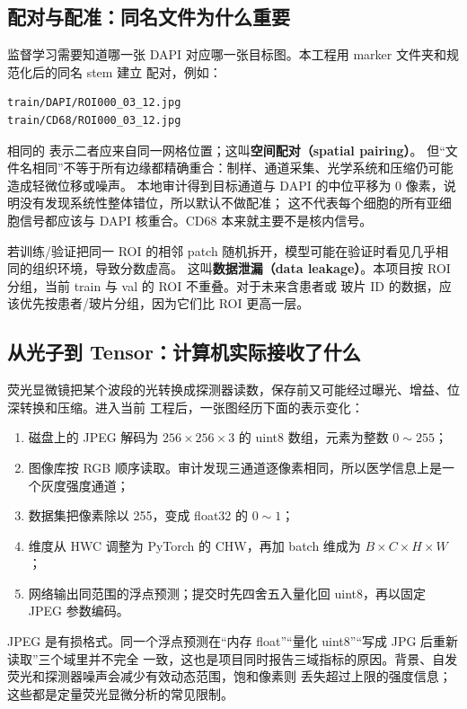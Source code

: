 \documentclass[12pt,a4paper,UTF8]{ctexart}
\newcommand{\code}[1]{\texttt{\detokenize{#1}}}
\newcommand{\term}[2]{\textbf{#1（#2）}}
\begin{document}
\subsection{配对与配准：同名文件为什么重要}

监督学习需要知道哪一张 DAPI 对应哪一张目标图。本工程用 marker 文件夹和规范化后的同名 stem 建立
配对，例如：

\begin{lstlisting}[style=shell]
train/DAPI/ROI000_03_12.jpg
train/CD68/ROI000_03_12.jpg
\end{lstlisting}

相同的 \code{ROI000_03_12}表示二者应来自同一网格位置；这叫\term{空间配对}{spatial pairing}。
但“文件名相同”不等于所有边缘都精确重合：制样、通道采集、光学系统和压缩仍可能造成轻微位移或噪声。
本地审计得到目标通道与 DAPI 的中位平移为 0 像素，说明没有发现系统性整体错位，所以默认不做配准；
这不代表每个细胞的所有亚细胞信号都应该与 DAPI 核重合。CD68 本来就主要不是核内信号。

若训练/验证把同一 ROI 的相邻 patch 随机拆开，模型可能在验证时看见几乎相同的组织环境，导致分数虚高。
这叫\term{数据泄漏}{data leakage}。本项目按 ROI 分组，当前 train 与 val 的 ROI 不重叠。对于未来含患者或
玻片 ID 的数据，应该优先按患者/玻片分组，因为它们比 ROI 更高一层。

\subsection{从光子到 Tensor：计算机实际接收了什么}

荧光显微镜把某个波段的光转换成探测器读数，保存前又可能经过曝光、增益、位深转换和压缩。进入当前
工程后，一张图经历下面的表示变化：

\begin{enumerate}
  \item 磁盘上的 JPEG 解码为 $256\times256\times3$ 的 uint8 数组，元素为整数 $0\sim255$；
  \item 图像库按 RGB 顺序读取。审计发现三通道逐像素相同，所以医学信息上是一个灰度强度通道；
  \item 数据集把像素除以 255，变成 float32 的 $0\sim1$；
  \item 维度从 HWC 调整为 PyTorch 的 CHW，再加 batch 维成为 $B\times C\times H\times W$；
  \item 网络输出同范围的浮点预测；提交时先四舍五入量化回 uint8，再以固定 JPEG 参数编码。
\end{enumerate}

JPEG 是有损格式。同一个浮点预测在“内存 float”“量化 uint8”“写成 JPG 后重新读取”三个域里并不完全
一致，这也是项目同时报告三域指标的原因。背景、自发荧光和探测器噪声会减少有效动态范围，饱和像素则
丢失超过上限的强度信息；这些都是定量荧光显微分析的常见限制\cite{fluorescence_quantitation}。
\end{document}
